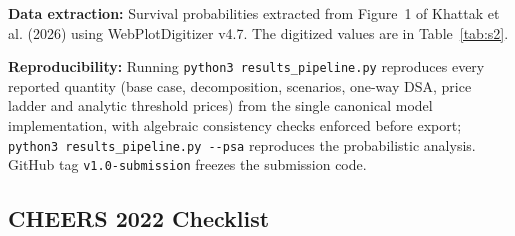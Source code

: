 \documentclass[11pt,a4paper]{article}
\begin{document}
\textbf{Data extraction:} Survival probabilities extracted from Figure~1 of Khattak et al. (2026) using WebPlotDigitizer v4.7. The digitized values are in Table~\ref{tab:s2}.

\textbf{Reproducibility:} Running \texttt{python3 results\_pipeline.py} reproduces every reported quantity (base case, decomposition, scenarios, one-way DSA, price ladder and analytic threshold prices) from the single canonical model implementation, with algebraic consistency checks enforced before export; \texttt{python3 results\_pipeline.py -{}-psa} reproduces the probabilistic analysis. GitHub tag \texttt{v1.0-submission} freezes the submission code.

\subsection{CHEERS 2022 Checklist}
\label{sec:cheers}
\end{document}
